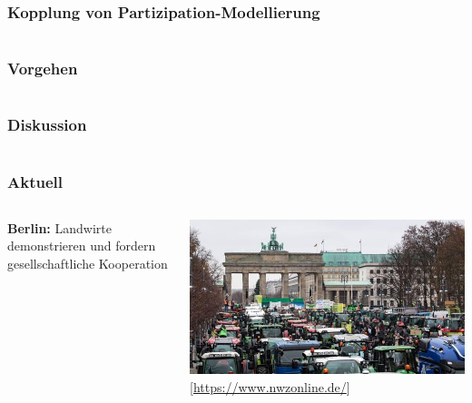 \documentclass{beamer}
\begin{document}
\begin{frame}
\frametitle{Kopplung von Partizipation-Modellierung}
\begin{columns}[c] %



\end{columns}
\end{frame}

\begin{frame}
\frametitle{Vorgehen}
\begin{columns}[c] %



\end{columns}
\end{frame}

\begin{frame}
\frametitle{Diskussion}
\begin{columns}[c] %



\end{columns}
\end{frame}



\begin{frame}
\frametitle{Aktuell}
\begin{columns}[c] %

\textbf{Berlin:}
Landwirte demonstrieren und fordern gesellschaftliche Kooperation

\includegraphics[scale=0.22]{demo.jpg}
\tiny [\url{https://www.nwzonline.de/}]
\end{columns}
\end{frame}
\end{document}

